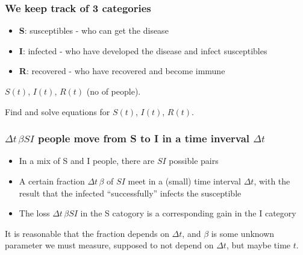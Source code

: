 \documentclass{beamer}
\newenvironment{block_mdfboxadmon}[1][]{\begin{block}{#1}}{\end{block}}
\begin{document}
\begin{frame}
\frametitle{We keep track of 3 categories}

\begin{block_mdfboxadmon}
\begin{itemize}
 \item \textbf{S}: susceptibles - who can get the disease

 \item \textbf{I}: infected - who have developed the disease and infect susceptibles

 \item \textbf{R}: recovered - who have recovered and become immune
\end{itemize}

\noindent
\end{block_mdfboxadmon}




\begin{block_mdfboxadmon}
$S(t)$, $I(t)$, $R(t)$ (no of people).
\end{block_mdfboxadmon}




\begin{block_mdfboxadmon}[Goal:]
Find and solve equations for $S(t)$, $I(t)$, $R(t)$.
\end{block_mdfboxadmon}
\end{frame}

\begin{frame}
\frametitle{$\Delta t\,\beta SI$ people move from S to I in a time inverval $\Delta t$}

\begin{block_mdfboxadmon}[S-I interaction:]
\begin{itemize}
  \item In a mix of S and I people, there are $SI$ possible pairs

  \item A certain fraction $\Delta t\,\beta$ of $SI$ meet in a (small)
    time interval $\Delta t$, with the result that the infected
    ``successfully'' infects the susceptible

  \item The loss $\Delta t\,\beta SI$ in the S catogory is a corresponding
    gain in the I category
\end{itemize}

\noindent
\end{block_mdfboxadmon}




\begin{block_mdfboxadmon}[Remark.]
\vspace{0.5mm}\par\noindent
{\footnotesize It is reasonable that the fraction depends on $\Delta t$, and
$\beta$ is some unknown parameter we must measure, supposed to not
depend on $\Delta t$, but maybe time $t$.
\par}
\end{block_mdfboxadmon}
\end{frame}
\end{document}
